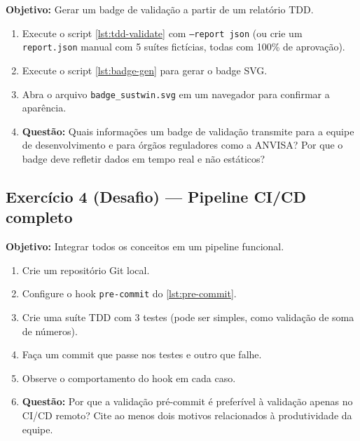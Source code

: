\textbf{Objetivo:} Gerar um badge de validação a partir de um relatório TDD.

\begin{enumerate}
  \item Execute o script \autoref{lst:tdd-validate} com \texttt{--report json}
        (ou crie um \texttt{report.json} manual com 5 suítes fictícias, todas
        com 100\% de aprovação).
  \item Execute o script \autoref{lst:badge-gen} para gerar o badge SVG.
  \item Abra o arquivo \texttt{badge\_sustwin.svg} em um navegador para
        confirmar a aparência.
  \item \textbf{Questão:} Quais informações um badge de validação transmite
        para a equipe de desenvolvimento e para órgãos reguladores como a
        ANVISA? Por que o badge deve refletir dados em tempo real e não
        estáticos?
\end{enumerate}

\subsection*{Exercício 4 (Desafio) — Pipeline CI/CD completo}

\textbf{Objetivo:} Integrar todos os conceitos em um pipeline funcional.

\begin{enumerate}
  \item Crie um repositório Git local.
  \item Configure o hook \texttt{pre-commit} do \autoref{lst:pre-commit}.
  \item Crie uma suíte TDD com 3 testes (pode ser simples, como validação
        de soma de números).
  \item Faça um commit que passe nos testes e outro que falhe.
  \item Observe o comportamento do hook em cada caso.
  \item \textbf{Questão:} Por que a validação pré-commit é preferível à
        validação apenas no CI/CD remoto? Cite ao menos dois motivos
        relacionados à produtividade da equipe.
\end{enumerate}

